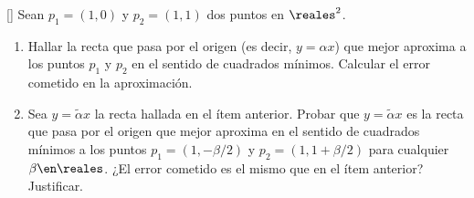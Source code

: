 \begin{enunciado}{\ejExtra}{\tiny[]}
  Sean $p_1 = (1, 0)$ y $p_2 = (1,1)$ dos puntos en $\reales^2$.
  \begin{enumerate}[label=(\alph*)]
    \item Hallar la recta que pasa por el origen (es decir, $y = \alpha x$) que mejor aproxima a los
          puntos $p_1$ y $p_2$ en el sentido de cuadrados mínimos. Calcular el error cometido en la aproximación.

    \item Sea $y = \tilde{\alpha}x$ la recta hallada en el ítem anterior. Probar que $y = \tilde{\alpha}x$ es la
          recta que pasa por el origen que mejor aproxima en el sentido de cuadrados mínimos a los puntos $p_1 = (1, -\beta/2)$
          y $p_2 = (1, 1+ \beta/2)$ para cualquier $\beta \en \reales$. ¿El error cometido es el mismo que en el ítem anterior?
          Justificar.
  \end{enumerate}
\end{enunciado}

